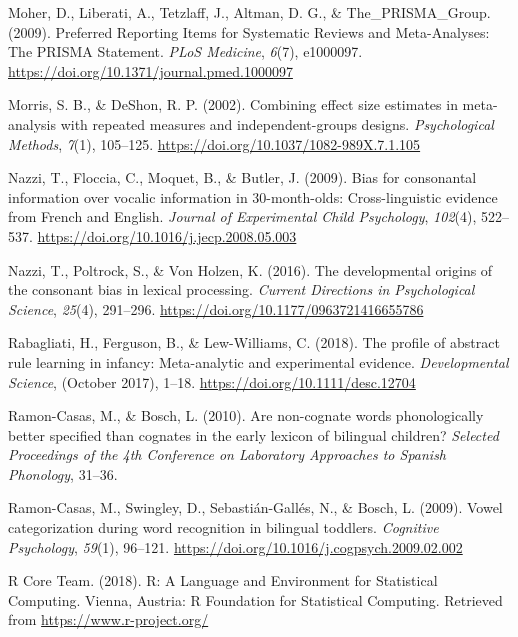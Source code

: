 \documentclass[
  english,
  man, noextraspace]{apa6}
\newlength{\cslhangindent}
\newenvironment{cslreferences}%
  {\setlength{\parindent}{0pt}%
  \everypar{\setlength{\hangindent}{\cslhangindent}}\ignorespaces}%
  {\par}
\begin{document}
\begin{cslreferences}
\leavevmode\hypertarget{ref-Moher2009}{}%
Moher, D., Liberati, A., Tetzlaff, J., Altman, D. G., \& The\_PRISMA\_Group. (2009). Preferred Reporting Items for Systematic Reviews and Meta-Analyses: The PRISMA Statement. \emph{PLoS Medicine}, \emph{6}(7), e1000097. \url{https://doi.org/10.1371/journal.pmed.1000097}

\leavevmode\hypertarget{ref-morris2002combining}{}%
Morris, S. B., \& DeShon, R. P. (2002). Combining effect size estimates in meta-analysis with repeated measures and independent-groups designs. \emph{Psychological Methods}, \emph{7}(1), 105--125. \url{https://doi.org/10.1037/1082-989X.7.1.105}

\leavevmode\hypertarget{ref-Nazzi2009a}{}%
Nazzi, T., Floccia, C., Moquet, B., \& Butler, J. (2009). Bias for consonantal information over vocalic information in 30-month-olds: Cross-linguistic evidence from French and English. \emph{Journal of Experimental Child Psychology}, \emph{102}(4), 522--537. \url{https://doi.org/10.1016/j.jecp.2008.05.003}

\leavevmode\hypertarget{ref-Nazzi2016}{}%
Nazzi, T., Poltrock, S., \& Von Holzen, K. (2016). The developmental origins of the consonant bias in lexical processing. \emph{Current Directions in Psychological Science}, \emph{25}(4), 291--296. \url{https://doi.org/10.1177/0963721416655786}

\leavevmode\hypertarget{ref-Rabagliati2018}{}%
Rabagliati, H., Ferguson, B., \& Lew-Williams, C. (2018). The profile of abstract rule learning in infancy: Meta-analytic and experimental evidence. \emph{Developmental Science}, (October 2017), 1--18. \url{https://doi.org/10.1111/desc.12704}

\leavevmode\hypertarget{ref-Ramon-Casas2010}{}%
Ramon-Casas, M., \& Bosch, L. (2010). Are non-cognate words phonologically better specified than cognates in the early lexicon of bilingual children? \emph{Selected Proceedings of the 4th Conference on Laboratory Approaches to Spanish Phonology}, 31--36.

\leavevmode\hypertarget{ref-Ramon-Casas2009}{}%
Ramon-Casas, M., Swingley, D., Sebastián-Gallés, N., \& Bosch, L. (2009). Vowel categorization during word recognition in bilingual toddlers. \emph{Cognitive Psychology}, \emph{59}(1), 96--121. \url{https://doi.org/10.1016/j.cogpsych.2009.02.002}

\leavevmode\hypertarget{ref-R}{}%
R Core Team. (2018). R: A Language and Environment for Statistical Computing. Vienna, Austria: R Foundation for Statistical Computing. Retrieved from \url{https://www.r-project.org/}


\end{cslreferences}
\end{document}
